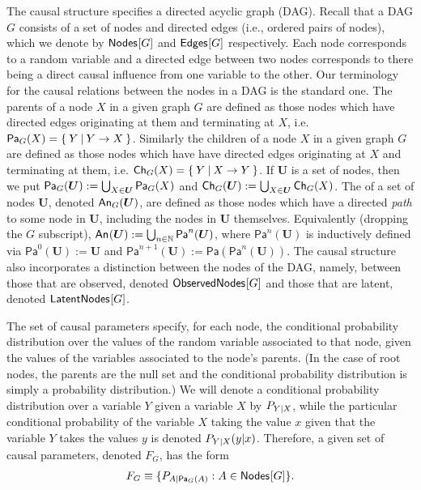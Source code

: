 The causal structure specifies a directed acyclic graph (DAG).  Recall that a DAG $G$ consists of a set of nodes and directed edges (i.e., ordered pairs of nodes), which we denote by $\nodes{G}$ and $\edges{G}$ respectively.  Each node corresponds to a random variable and a directed edge between two nodes corresponds to there being a direct causal influence from one variable to the other.   Our terminology for the causal relations between the nodes in a DAG is the standard one. The parents of a node $X$ in a given graph $G$ are defined as those nodes which have directed edges originating at them and terminating at $X$, i.e. $\Pa[G]{X} = \{\:Y\:|\:Y\to X\:\}$.  Similarly the children of a node $X$ in a given graph $G$ are defined as those nodes which have have directed edges originating at $X$ and terminating at them, i.e. $\Ch[G]{X} = \{\:Y\:|\: X\to Y\:\}$. If $\bm{U}$ is a set of nodes, then we put $\Pa[G]{\bm{U}} := \bigcup_{X\in\bm{U}} \Pa[G]{X}$ and $\Ch[G]{\bm{U}} := \bigcup_{X\in\bm{U}} \Ch[G]{X}$.  The  of a set of nodes $\bm{U}$, denoted $\An[G]{\bm{U}}$, are defined as those nodes which have a directed \emph{path} to some node in $\bm{U}$, including the nodes in $\bm{U}$ themselves. Equivalently (dropping the $G$ subscript), $\An{\bm{U}} := \bigcup_{n\in\mathbb{N}} \mathsf{Pa}^n(\bm{U})$, where $\mathsf{Pa}^n(\bm{U})$ is inductively defined via $\mathsf{Pa}^0(\bm{U}) := \bm{U}$ and $\mathsf{Pa}^{n+1}(\bm{U}) := \mathsf{Pa}(\mathsf{Pa}^n(\bm{U}))$.  The causal structure also incorporates a distinction between the nodes of the DAG, namely, between those that are observed, denoted $\SmallNamedFunction{ObservedNodes}{G}$ and those that are latent, denoted $\SmallNamedFunction{LatentNodes}{G}$.

The set of causal parameters specify, for each node, the conditional probability distribution over the values of the random variable associated to that node, given the values of the variables associated to the node's parents.  (In the case of root nodes, the parents are the null set and the conditional probability distribution is simply a probability distribution.)
 We will denote a conditional probability distribution over a variable $Y$ given a variable $X$ by $\pfunc{Y|X}$, while the particular conditional probability of the variable $X$ taking the value $x$ given that the variable $Y$ takes the values $y$ is denoted $\pdf[Y|X]{y|x}$.  
Therefore, a given set of causal parameters, denoted $F_G$, has the form
\begin{align}
F_G \equiv \{ \pfunc{A|\Pa[G]{A}} : A \in \SmallNamedFunction{Nodes}{G} \}.
\end{align}

